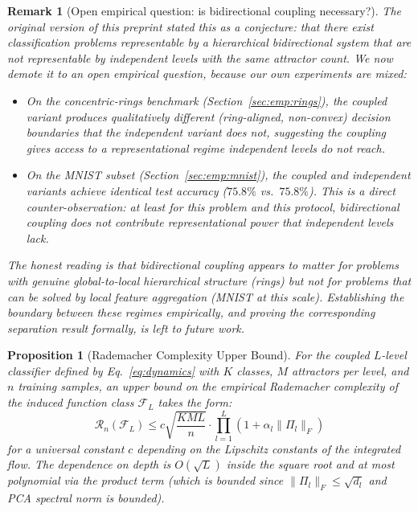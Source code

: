 \documentclass[11pt,a4paper]{article}
\newtheorem{proposition}[theorem]{Proposition}
\newtheorem{remark}[theorem]{Remark}
\begin{document}
\begin{remark}[Open empirical question: is bidirectional coupling necessary?]
\label{prop:bidi_necessary}
The original version of this preprint stated this as a conjecture: that there exist
classification problems representable by a hierarchical bidirectional system that are
not representable by independent levels with the same attractor count. We now demote it
to an \emph{open empirical question}, because our own experiments are mixed:

\begin{itemize}
  \item On the concentric-rings benchmark (Section~\ref{sec:emp:rings}), the coupled
        variant produces qualitatively different (ring-aligned, non-convex) decision
        boundaries that the independent variant does not, suggesting the coupling
        gives access to a representational regime independent levels do not reach.
  \item On the MNIST subset (Section~\ref{sec:emp:mnist}), the coupled and
        independent variants achieve \emph{identical} test accuracy ($75.8\%$ vs.\
        $75.8\%$). This is a direct counter-observation: at least for this problem
        and this protocol, bidirectional coupling does not contribute representational
        power that independent levels lack.
\end{itemize}

The honest reading is that bidirectional coupling appears to matter for problems with
genuine global-to-local hierarchical structure (rings) but not for problems that can be
solved by local feature aggregation (MNIST at this scale). Establishing the boundary
between these regimes empirically, and proving the corresponding separation result
formally, is left to future work.
\end{remark}

\begin{proposition}[Rademacher Complexity Upper Bound]
\label{prop:rademacher}
For the coupled $L$-level classifier defined by Eq.~\ref{eq:dynamics} with $K$ classes,
$M$ attractors per level, and $n$ training samples, an upper bound on the empirical
Rademacher complexity of the induced function class $\mathcal{F}_L$ takes the form:
\begin{equation}
  \mathcal{R}_n(\mathcal{F}_L) \le c \sqrt{\frac{KML}{n}}
    \cdot \prod_{l=1}^{L}(1 + \alpha_l\|\Pi_l\|_F)
\end{equation}
for a universal constant $c$ depending on the Lipschitz constants of the integrated flow.
The dependence on depth is $O(\sqrt{L})$ inside the square root and at most polynomial via
the product term (which is bounded since $\|\Pi_l\|_F \le \sqrt{d_l}$ and PCA spectral
norm is bounded).
\end{proposition}
\end{document}
